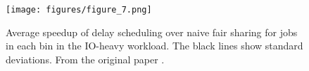 \begin{figure}
  \centering
  \texttt{[image: figures/figure\_7.png]}
  \caption{Average speedup of delay scheduling over naive fair sharing for jobs in each bin in the IO-heavy workload. The black lines show standard deviations. From the original paper \cite{ds}.}
  \label{fig:original_7}
\end{figure}

